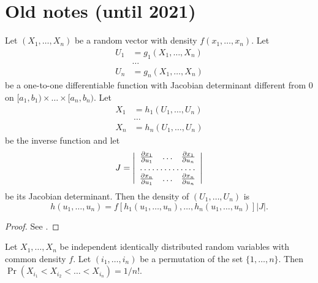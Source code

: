 \chapter{Old notes (until 2021)}

\begin{note} \label{note:fmvrv}
Let $(X_1, \ldots, X_n)$ be a random vector with density $f(x_1,
\ldots, x_n)$. Let
\begin{align*}
U_1 &= g_1(X_1, \ldots, X_n) \\
& \ldots \\
U_n &= g_n(X_1, \ldots, X_n)
\end{align*}
be a one-to-one differentiable function with Jacobian determinant
different from 0 on $[a_1, b_1) \times \ldots \times [a_n, b_n)$. Let
\begin{align*}
X_1 &= h_1(U_1, \ldots, U_n) \\
& \ldots \\
X_n &= h_n(U_1, \ldots, U_n)
\end{align*}
be the inverse function and let
\[ J = \left|
\begin{array}{ccc}
  \frac{\partial x_1}{\partial u_1} &
  \ldots &
  \frac{\partial x_1}{\partial u_n} \\
  \hdotsfor{3} \\
  \frac{\partial x_n}{\partial u_1} &
  \ldots &
  \frac{\partial x_n}{\partial u_n} \\
\end{array}
\right|
\]
be its Jacobian determinant. Then the density of $(U_1, \ldots, U_n)$
is
\[
h(u_1, \ldots, u_n) = f[h_1(u_1, \ldots, u_n), \ldots, h_n(u_1,
  \ldots, u_n)]|J|.
\]
\end{note}

\begin{proof}
See \cite[\S2.9, p.~67]{fisz-1969}.
\end{proof}

\begin{note}
Let $X_1, \ldots, X_n$ be independent identically distributed random
variables with common density $f$. Let $(i_1, \ldots, i_n)$ be a
permutation of the set $\{1, \ldots, n\}$. Then $\Pr(X_{i_1} < X_{i_2}
< \ldots < X_{i_n}) = 1 / n!$.
\end{note}

